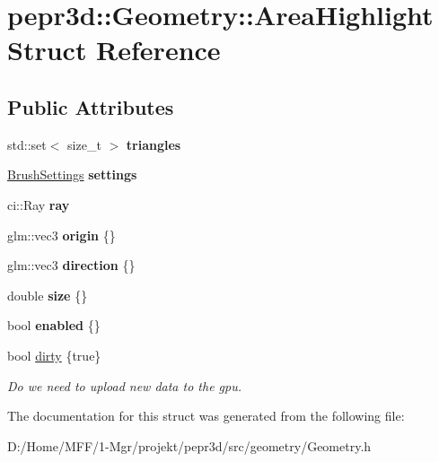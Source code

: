 \hypertarget{structpepr3d_1_1_geometry_1_1_area_highlight}{}\section{pepr3d\+::Geometry\+::Area\+Highlight Struct Reference}
\label{structpepr3d_1_1_geometry_1_1_area_highlight}
\subsection*{Public Attributes}
\begin{DoxyCompactItemize}
\item 
\mbox{\label{structpepr3d_1_1_geometry_1_1_area_highlight_a39bafbb704eed4caf358ea9778fb64a9}} 
std\+::set$<$ size\+\_\+t $>$ {\bfseries triangles}
\item 
\mbox{\label{structpepr3d_1_1_geometry_1_1_area_highlight_a539a565869566b643d3536c2b9e3998f}} 
\mbox{\hyperlink{structpepr3d_1_1_brush_settings}{Brush\+Settings}} {\bfseries settings}
\item 
\mbox{\label{structpepr3d_1_1_geometry_1_1_area_highlight_ad39e62ccee10d0fb4c8165627aa952ec}} 
ci\+::\+Ray {\bfseries ray}
\item 
\mbox{\label{structpepr3d_1_1_geometry_1_1_area_highlight_a33cf93e0ff8d167b0a4b877740dee49d}} 
glm\+::vec3 {\bfseries origin} \{\}
\item 
\mbox{\label{structpepr3d_1_1_geometry_1_1_area_highlight_a7538655d67f5bfb2a04117f6fa6d3f51}} 
glm\+::vec3 {\bfseries direction} \{\}
\item 
\mbox{\label{structpepr3d_1_1_geometry_1_1_area_highlight_a980ab51ea5dac86ef2fb68dbf6dc079f}} 
double {\bfseries size} \{\}
\item 
\mbox{\label{structpepr3d_1_1_geometry_1_1_area_highlight_a054fa63a3e60e4a1e3b8db7a22aebf6f}} 
bool {\bfseries enabled} \{\}
\item 
\mbox{\label{structpepr3d_1_1_geometry_1_1_area_highlight_a129df0b43636f676500fdf0beb3cd021}} 
bool \mbox{\hyperlink{structpepr3d_1_1_geometry_1_1_area_highlight_a129df0b43636f676500fdf0beb3cd021}{dirty}} \{true\}
\begin{DoxyCompactList}\small\item\em Do we need to upload new data to the gpu. \end{DoxyCompactList}\end{DoxyCompactItemize}


The documentation for this struct was generated from the following file\+:\begin{DoxyCompactItemize}
\item 
D\+:/\+Home/\+M\+F\+F/1-\/\+Mgr/projekt/pepr3d/src/geometry/Geometry.\+h\end{DoxyCompactItemize}
